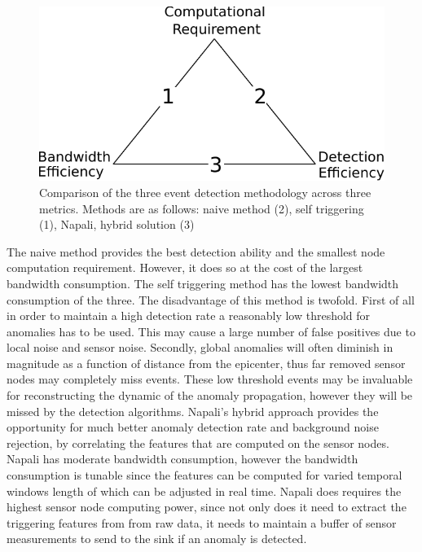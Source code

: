 \begin{figure}[h]
	  \centering
	  \includegraphics[width=0.5\linewidth]{img/edge_computing_vs.pdf}
	\caption{Comparison of the three event detection methodology across three metrics. Methods are as follows: naive method (2), self triggering (1), Napali, hybrid solution (3)}
	\label{intro:fig:edge}
\end{figure}
The naive method provides the best detection ability and the smallest node computation requirement. However, it does so at the cost of the largest bandwidth consumption. The self triggering method has the lowest bandwidth consumption of the three. The disadvantage of this method is twofold. First of all in order to maintain a high detection rate a reasonably low threshold for anomalies has to be used. This may cause a large number of false positives due to local noise and sensor noise. Secondly, global anomalies will often diminish in magnitude as a function of distance from the epicenter, thus far removed sensor nodes may completely miss events. These low threshold events may be invaluable for reconstructing the dynamic of the anomaly propagation, however they will be missed by the detection algorithms. Napali's hybrid approach provides the opportunity for much better anomaly detection rate and background noise rejection, by correlating the features that are computed on the sensor nodes. Napali has moderate bandwidth consumption, however the bandwidth consumption is tunable since the features can be computed for varied temporal windows length of which can be adjusted in real time. Napali does requires the highest sensor node computing power, since not only does it need to extract the triggering features from from raw data, it needs to maintain a buffer of sensor measurements to send to the sink if an anomaly is detected.

